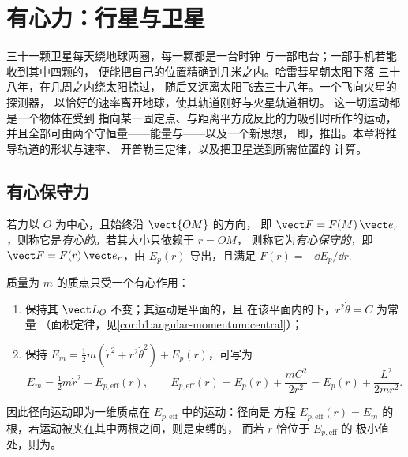 \chapter{有心力：行星与卫星}\label{ch:b1:central-forces}

三十一颗卫星每天绕地球两圈，每一颗都是一台时钟
与一部电台；一部手机若能收到其中四颗的，
便能把自己的位置精确到几米之内。哈雷彗星朝太阳下落
三十八年，在几周之内绕太阳掠过，
随后又远离太阳飞去三十八年。一个飞向火星的探测器，
以恰好的速率离开地球，使其轨道刚好与火星轨道相切。
这一切运动都是一个物体在受到
指向某一固定点、与距离平方成反比的力吸引时所作的运动，
并且全部可由两个守恒量——能量与——以及一个新思想，
即，推出。本章将推导轨道的形状与速率、
开普勒三定律，以及把卫星送到所需位置的
计算。

\section{有心保守力}

\begin{definition}\label{def:b1:central-forces:central}
若力以 $O$ 为中心，且始终沿 $\vect{OM}$ 的方向，
即 $\vect F = F(M)\,\vect e_r$，则称它是\emph{有心的}。若其大小只依赖于 $r = OM$，
则称它为\emph{有心保守的}，即 $\vect F =
F(r)\,\vect e_r$，由 $E_p(r)$ 导出，且满足
$F(r) = -\dd E_p/\dd r$.
\end{definition}

\begin{theorem}[有心保守力下的运动]\label{thm:b1:central-forces:reduction}
质量为 $m$ 的质点只受一个有心作用：
\begin{enumerate}
  \item 保持其 $\vect L_O$ 不变；其运动是平面的，且
        在该平面内的下，$r^2\dot\theta = C$ 为常量
        （面积定律，见\cref{cor:b1:angular-momentum:central}）；
  \item 保持 $E_m = \tfrac12 m(\dot r^2 + r^2\dot\theta^2)
        + E_p(r)$，可写为
        \[
        E_m = \tfrac12 m\dot r^2 + E_{p,\mathrm{eff}}(r), \qquad
        E_{p,\mathrm{eff}}(r) = E_p(r) + \frac{mC^2}{2r^2} = E_p(r) + \frac{L^2}{2mr^2} .
        \]
\end{enumerate}
因此径向运动即为一维质点在
\emph{} $E_{p,\mathrm{eff}}$ 中的运动：径向是
方程 $E_{p,\mathrm{eff}}(r) = E_m$ 的根，若运动被夹在其中两根之间，则是束缚的，
而若 $r$ 恰位于 $E_{p,\mathrm{eff}}$ 的
极小值处，则为。
\end{theorem}

